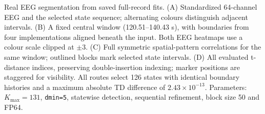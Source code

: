 Real EEG segmentation from saved full-record fits. (A) Standardized 64-channel EEG and the selected state sequence; alternating colours distinguish adjacent intervals. (B) A fixed central window (120.51--140.43 s), with boundaries from four implementations aligned beneath the input. Both EEG heatmaps use a colour scale clipped at $\pm3$. (C) Full symmetric spatial-pattern correlations for the same window; outlined blocks mark selected state intervals. (D) All evaluated t-distance indices, preserving double-insertion indexing; marker positions are staggered for visibility. All routes select 126 states with identical boundary histories and a maximum absolute TD difference of $2.43\times10^{-13}$. Parameters: $K_{\max}=131$, \texttt{dmin=5}, statewise detection, sequential refinement, block size 50 and FP64.
